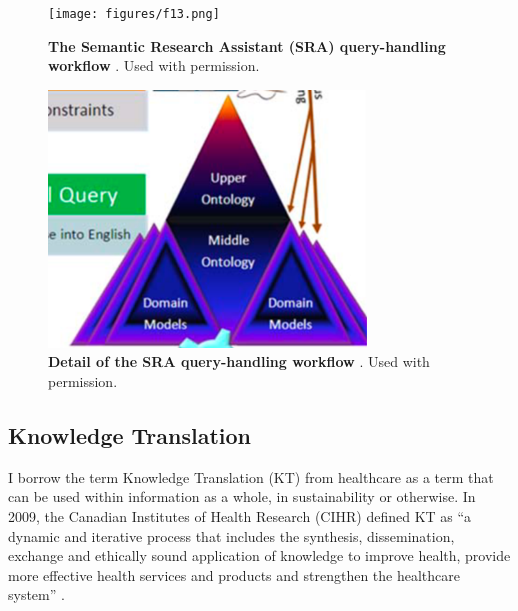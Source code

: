 \FloatBarrier
\begin{figure}[h]
    \centering
    \begin{minipage}{0.49\textwidth}
        \centering
        \texttt{[image: figures/f13.png]}
        \caption[The Semantic Research Assistant (SRA) query-handling workflow]{\textbf{The Semantic Research Assistant (SRA) query-handling workflow} \citep[p. 7]{lenat_harnessing_2010}. Used with permission.}
        \label{fig:13}
    \end{minipage}\hfill
    \begin{minipage}{0.49\textwidth}
        \centering
        \includegraphics[width=\textwidth]{figures/f13r.png}
        \caption[Detail of the SRA query-handling workflow]{\textbf{Detail of the SRA query-handling workflow} \citep[p. 7]{lenat_harnessing_2010}. Used with permission.}
        \label{fig:14}
    \end{minipage}
\end{figure}
\FloatBarrier
\subsection{Knowledge Translation}
I borrow the term Knowledge Translation (KT) from healthcare as a term that can be used within information as a whole, in sustainability or otherwise. In 2009, the Canadian Institutes of Health Research (CIHR) defined KT as “a dynamic and iterative process that includes the synthesis, dissemination, exchange and ethically sound application of knowledge to improve health, provide more effective health services and products and strengthen the healthcare system” \citep[p. 4]{straus_knowledge_2009-1}. 

